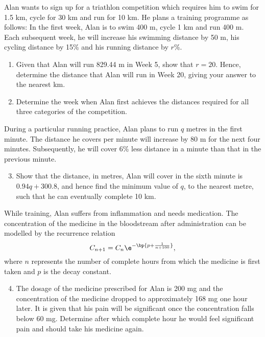 \begin{problem}
    Alan wants to sign up for a triathlon competition which requires him to swim for 1.5 km, cycle for 30 km and run for 10 km. He plans a training programme as follows: In the first week, Alan is to swim 400 m, cycle 1 km and run 400 m. Each subsequent week, he will increase his swimming distance by 50 m, his cycling distance by 15\% and his running distance by $r$\%.
        
    \begin{enumerate}
        \item Given that Alan will run 829.44 m in Week 5, show that $r = 20$. Hence, determine the distance that Alan will run in Week 20, giving your answer to the nearest km.
        \item Determine the week when Alan first achieves the distances required for all three categories of the competition.
    \end{enumerate}

    During a particular running practice, Alan plans to run $q$ metres in the first minute. The distance he covers per minute will increase by 80 m for the next four minutes. Subsequently, he will cover 6\% less distance in a minute than that in the previous minute.

    \begin{enumerate}
        \setcounter{enumi}{2}
        \item Show that the distance, in metres, Alan will cover in the sixth minute is $0.94q + 300.8$, and hence find the minimum value of $q$, to the nearest metre, such that he can eventually complete 10 km.
    \end{enumerate}

    While training, Alan suffers from inflammation and needs medication. The concentration of the medicine in the bloodstream after administration can be modelled by the recurrence relation \[C_{n+1} = C_n \e^{-\bp{p + \frac{1}{n+100}}},\] where $n$ represents the number of complete hours from which the medicine is first taken and $p$ is the decay constant.

    \begin{enumerate}
        \setcounter{enumi}{3}
        \item The dosage of the medicine prescribed for Alan is 200 mg and the concentration of the medicine dropped to approximately 168 mg one hour later. It is given that his pain will be significant once the concentration falls below 60 mg. Determine after which complete hour he would feel significant pain and should take his medicine again.
    \end{enumerate}
\end{problem}
